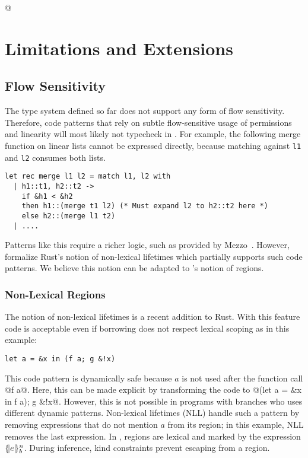 \lstMakeShortInline[keepspaces,basicstyle=\small\ttfamily]@
\section{Limitations and Extensions}

\subsection{Flow Sensitivity}

The type system defined so far does not support any
form of flow sensitivity. Therefore, code patterns that rely on
subtle flow-sensitive usage of permissions and linearity will most likely not
typecheck in \lang. For example, the following merge function on linear lists
cannot be expressed directly, because matching against
\lstinline/l1/ and \lstinline/l2/ consumes both lists.

\begin{lstlisting}
let rec merge l1 l2 = match l1, l2 with
  | h1::t1, h2::t2 ->
    if &h1 < &h2 
    then h1::(merge t1 l2) (* Must expand l2 to h2::t2 here *)
    else h2::(merge l1 t2)
  | ....
\end{lstlisting}

Patterns like this require a richer logic, such as provided by
Mezzo~\citep{DBLP:phd/hal/Protzenko14}.
However,
\citet{DBLP:journals/corr/abs-1903-00982} formalize Rust's
notion of non-lexical lifetimes which partially supports such
code patterns. We believe this notion can be adapted to \lang's notion of
regions.

\subsubsection*{Non-Lexical Regions}

The notion of non-lexical lifetimes is 
a recent addition to Rust.
With this feature code is acceptable even if borrowing does not respect
lexical scoping as in this example:

\begin{lstlisting}[numbers=none]
let a = &x in (f a; g &!x)
\end{lstlisting}

This code pattern is dynamically safe because $a$ is not used after
the function call @f a@.
Here, this can be made explicit by transforming
the code to @(let a = &x in f a); g &!x@. However, this is not possible
in programs with branches who uses different dynamic patterns.
Non-lexical lifetimes (NLL) handle such a pattern by removing expressions
that do not mention $a$ from its region; in this example,  NLL removes
the last expression.
%
In \lang, regions are lexical and marked by the
expression $\region{b}{e}$.
During inference, kind constraints prevent escaping from
a region.

